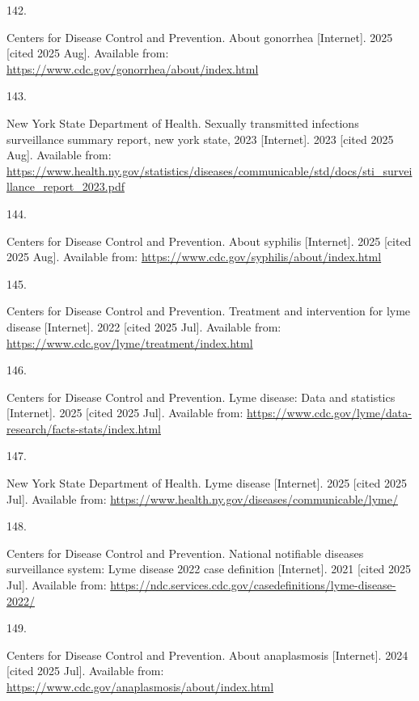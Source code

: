 \documentclass[
  english,
  letterpaper,
]{report}
\newlength{\cslhangindent}
\newlength{\csllabelwidth}
\newenvironment{CSLReferences}[2] %
 {\begin{list}{}{%
  \setlength{\itemindent}{0pt}
  \setlength{\leftmargin}{0pt}
  \setlength{\parsep}{0pt}
  \ifodd #1
   \setlength{\leftmargin}{\cslhangindent}
   \setlength{\itemindent}{-1\cslhangindent}
  \fi
  \setlength{\itemsep}{#2\baselineskip}}}
 {\end{list}}
\newcommand{\CSLLeftMargin}[1]{\parbox[t]{\csllabelwidth}{\strut#1\strut}}
\newcommand{\CSLRightInline}[1]{\parbox[t]{\linewidth - \csllabelwidth}{\strut#1\strut}}
\begin{document}
\begin{CSLReferences}{0}{1}
\CSLLeftMargin{142. }%
\CSLRightInline{Centers for Disease Control and Prevention. About
gonorrhea {[}Internet{]}. 2025 {[}cited 2025 Aug{]}. Available from:
\url{https://www.cdc.gov/gonorrhea/about/index.html}}

\CSLLeftMargin{143. }%
\CSLRightInline{New York State Department of Health. Sexually
transmitted infections surveillance summary report, new york state, 2023
{[}Internet{]}. 2023 {[}cited 2025 Aug{]}. Available from:
\url{https://www.health.ny.gov/statistics/diseases/communicable/std/docs/sti_surveillance_report_2023.pdf}}

\CSLLeftMargin{144. }%
\CSLRightInline{Centers for Disease Control and Prevention. About
syphilis {[}Internet{]}. 2025 {[}cited 2025 Aug{]}. Available from:
\url{https://www.cdc.gov/syphilis/about/index.html}}

\CSLLeftMargin{145. }%
\CSLRightInline{Centers for Disease Control and Prevention. Treatment
and intervention for lyme disease {[}Internet{]}. 2022 {[}cited 2025
Jul{]}. Available from:
\url{https://www.cdc.gov/lyme/treatment/index.html}}

\CSLLeftMargin{146. }%
\CSLRightInline{Centers for Disease Control and Prevention. Lyme
disease: Data and statistics {[}Internet{]}. 2025 {[}cited 2025 Jul{]}.
Available from:
\url{https://www.cdc.gov/lyme/data-research/facts-stats/index.html}}

\CSLLeftMargin{147. }%
\CSLRightInline{New York State Department of Health. Lyme disease
{[}Internet{]}. 2025 {[}cited 2025 Jul{]}. Available from:
\url{https://www.health.ny.gov/diseases/communicable/lyme/}}

\CSLLeftMargin{148. }%
\CSLRightInline{Centers for Disease Control and Prevention. National
notifiable diseases surveillance system: Lyme disease 2022 case
definition {[}Internet{]}. 2021 {[}cited 2025 Jul{]}. Available from:
\url{https://ndc.services.cdc.gov/casedefinitions/lyme-disease-2022/}}

\CSLLeftMargin{149. }%
\CSLRightInline{Centers for Disease Control and Prevention. About
anaplasmosis {[}Internet{]}. 2024 {[}cited 2025 Jul{]}. Available from:
\url{https://www.cdc.gov/anaplasmosis/about/index.html}}


\end{CSLReferences}
\end{document}
